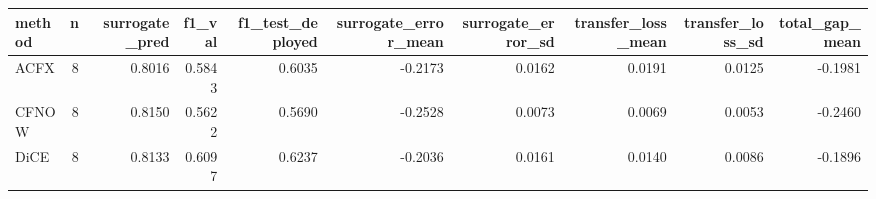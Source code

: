 \begin{tabular}{lrrrrrrrrr}
\toprule
method &  n &  surrogate\_pred &  f1\_val &  f1\_test\_deployed &  surrogate\_error\_mean &  surrogate\_error\_sd &  transfer\_loss\_mean &  transfer\_loss\_sd &  total\_gap\_mean \\
\midrule
  ACFX &  8 &          0.8016 &  0.5843 &            0.6035 &               -0.2173 &              0.0162 &              0.0191 &            0.0125 &         -0.1981 \\
 CFNOW &  8 &          0.8150 &  0.5622 &            0.5690 &               -0.2528 &              0.0073 &              0.0069 &            0.0053 &         -0.2460 \\
  DiCE &  8 &          0.8133 &  0.6097 &            0.6237 &               -0.2036 &              0.0161 &              0.0140 &            0.0086 &         -0.1896 \\
\bottomrule
\end{tabular}
